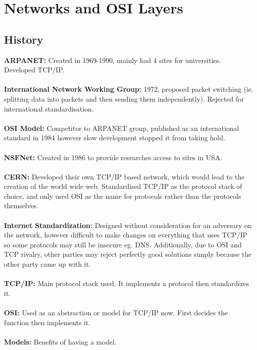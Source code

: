 \documentclass[a4paper,10pt]{article}
\begin{document}
\section{Networks and OSI Layers}
\subsection{History}
\textcolor{TealBlue}{\textbf{ARPANET:}} Created in 1969-1990, mainly had 4 sites for universities. Developed TCP/IP. \\\\
\textcolor{TealBlue}{\textbf{International Network Working Group:}} 1972, proposed packet switching (ie. splitting data into packets and then sending them independently). Rejected for international standardisation. \\\\
\textcolor{TealBlue}{\textbf{OSI Model:}} Competitor to ARPANET group, published as an international standard in 1984 however slow development stopped it from taking hold.\\\\ 
\textcolor{TealBlue}{\textbf{NSFNet:}} Created in 1986 to provide researches access to sites in USA. \\\\
\textcolor{TealBlue}{\textbf{CERN:}} Developed their own TCP/IP based network, which would lead to the creation of the world wide web. Standardised TCP/IP as the protocol stack of choice, and only used OSI as the name for protocols rather than the protocols themselves. \\\\
\textcolor{TealBlue}{\textbf{Internet Standardization:}} Designed without consideration for an adversary on the network, however difficult to make changes on everything that uses TCP/IP so some protocols may still be insecure eg. DNS. Additionally, due to OSI and TCP rivalry, other parties may reject perfectly good solutions simply because the other party came up with it. \\\\
\textcolor{TealBlue}{\textbf{TCP/IP:}} Main protocol stack used. It implements a protocol then standardizes it.\\\\ 
\textcolor{TealBlue}{\textbf{OSI:}} Used as an abstraction or model for TCP/IP now. First decides the function then implements it. \\\\
\textcolor{TealBlue}{\textbf{Models:}} Benefits of having a model. 
\end{document}
